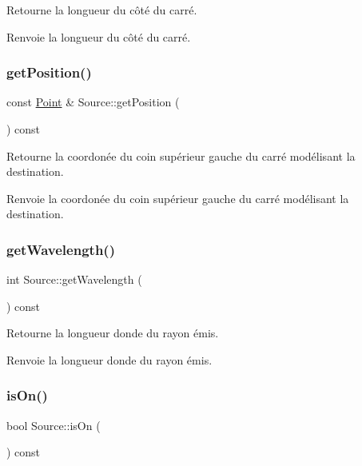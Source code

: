 Retourne la longueur du côté du carré. \begin{DoxyReturn}{Renvoie}
la longueur du côté du carré. 
\end{DoxyReturn}
\mbox{\label{class_source_a7d96a9cb9f3b28d3a4339a441f65e99a}} 
\subsubsection{\texorpdfstring{getPosition()}{getPosition()}}
{\footnotesize\ttfamily const \mbox{\hyperlink{class_point}{Point}} \& Source\+::get\+Position (\begin{DoxyParamCaption}{ }\end{DoxyParamCaption}) const}

Retourne la coordonée du coin supérieur gauche du carré modélisant la destination. \begin{DoxyReturn}{Renvoie}
la coordonée du coin supérieur gauche du carré modélisant la destination. 
\end{DoxyReturn}
\mbox{\label{class_source_a41452078cbe06622e2fc9f724dc473bc}} 
\subsubsection{\texorpdfstring{getWavelength()}{getWavelength()}}
{\footnotesize\ttfamily int Source\+::get\+Wavelength (\begin{DoxyParamCaption}{ }\end{DoxyParamCaption}) const}

Retourne la longueur d\textquotesingle{}onde du rayon émis. \begin{DoxyReturn}{Renvoie}
la longueur d\textquotesingle{}onde du rayon émis. 
\end{DoxyReturn}
\mbox{\label{class_source_a5a4edb05f29a47b66464d9d35883b68c}} 
\subsubsection{\texorpdfstring{isOn()}{isOn()}}
{\footnotesize\ttfamily bool Source\+::is\+On (\begin{DoxyParamCaption}{ }\end{DoxyParamCaption}) const}

